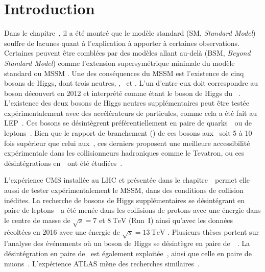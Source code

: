 \section{Introduction}\label{chapter-HTT_analysis-section-introduction}
Dans le chapitre~,
il a été montré que le modèle standard (SM, \emph{Standard Model}) souffre de lacunes quant à l'explication à apporter à certaines observations.
Certaines peuvent être comblées par des modèles allant au-delà (BSM, \emph{Beyond Standard Model}) comme l'extension supersymétrique minimale du modèle standard ou \og MSSM \fg.
Une des conséquences du MSSM est l'existence de cinq bosons de Higgs, dont trois neutres, \higgs, \Higgs\ et \HiggsA.
L'un d'entre-eux doit correspondre au boson découvert en 2012 et interprété comme étant le boson de Higgs du \SM~\cite{ATLAS_Higgs_discovery,CMS_Higgs_discovery,CMS_Higgs_discovery_2013,ATLAS-CMS-Higgs_combined_1,ATLAS-CMS-Higgs_combined_2}.
L'existence des deux bosons de Higgs neutres supplémentaires peut être testée expérimentalement avec des accélérateurs de particules,
comme cela a été fait au LEP~\cite{Schael:2006cr}.
Ces bosons se désintègrent préférentiellement en paire de quarks~\quarkb\ ou de leptons~\tau.
Bien que le rapport de branchement (\BR) de ces bosons aux \quarkb\ soit 5 à 10 fois supérieur que celui aux~\tau,
ces derniers proposent une meilleure accessibilité expérimentale dans les collisionneurs hadroniques comme le Tevatron,
ou ces désintégrations en~\tau\ ont été étudiées~\cite{Aaltonen:2009vf,Abazov:2011jh}.
\par
L'expérience CMS installée au LHC et présentée dans le chapitre~\ permet elle aussi de tester expérimentalement le MSSM, dans des conditions de collision inédites.
La recherche de bosons de Higgs supplémentaires se désintégrant en paire de leptons~\tau\ a été menée dans les collisions de protons avec une énergie dans le centre de masse de $\sqrt{s}=\num{7}$ et $\SI{8}{\TeV}$ (Run~I) \cite{Chatrchyan:2012vp,CMS-MSSM-HTT_2014,CMS-PAS-HIG-13-021,CMS-PAS-HIG-14-029} ainsi qu'avec les données récoltées en 2016 avec une énergie de $\sqrt{s}=\SI{13}{\TeV}$ \cite{CMS-PAS-HIG-17-020}.
Plusieurs thèses portent sur l'analyse des événements où un boson de Higgs se désintègre en paire de~\tau~\cite{Gael_thesis,Artur_thesis}.
La désintégration en paire de \quarkb\ est également exploitée~\cite{Chatrchyan:2013qga,Khachatryan:2015tra},
ainsi que celle en paire de muons~\cite{CMS:2015ooa}.
L'expérience ATLAS mène des recherches similaires~\cite{Aad:2012cfr,ATLAS-MSSM-HTT_2018,ATLAS-MSSM-HTT_2020}.
\par
